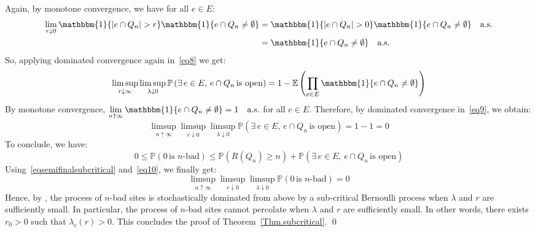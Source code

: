 \documentclass[10pt,a4paper]{amsart}
\theoremstyle{exampstyle}
\theoremstyle{exampnotations}
\begin{document}
Again, by monotone convergence, we have for all $e \in E$:
\begin{align*}
\lim_{r \downarrow 0} \mathbbm{1}\lbrace \vert e \cap Q_n \vert > r \rbrace \mathbbm{1}\lbrace e \cap Q_n \neq \emptyset \rbrace &= \mathbbm{1}\lbrace \vert e \cap Q_n \vert > 0 \rbrace \mathbbm{1}\lbrace e \cap Q_n \neq \emptyset \rbrace \quad \text{a.s.} \\ &= \mathbbm{1}\lbrace e \cap Q_n \neq \emptyset \rbrace \quad \text{a.s.}
\end{align*} 
So, applying dominated convergence again in~\eqref{eq8} we get:
\begin{equation}
\label{eq9}
   \limsup_{r \downarrow \infty}\limsup_{\lambda \downarrow 0} \mathbb{P}\left(\exists \, e \in E, \, e \cap Q_n \, \text{is open} \right)=1-\mathbb{E}\left(\prod_{e \in E } \mathbbm{1}\lbrace e \cap Q_n \neq \emptyset \rbrace \right)
\end{equation}
By monotone convergence, $\displaystyle \lim_{n \uparrow \infty}\mathbbm{1}\lbrace e \cap Q_n \neq \emptyset \rbrace = 1 \quad \text{a.s.}$ for all $e \in E$. Therefore, by dominated convergence in~\eqref{eq9}, we obtain:
\begin{equation}
    \label{eq10}
    \limsup_{n \uparrow \infty}\limsup_{r \downarrow 0}\limsup_{\lambda \downarrow 0} \mathbb{P}\left(\exists \, e \in E, \, e \cap Q_n \, \text{is open} \right) = 1-1 = 0
\end{equation}
To conclude, we have: 
\begin{equation*}
    0 \leq \mathbb{P}(0 \, \text{is $n$-bad}) \leq \mathbb{P}(R(Q_n) \geq n) + \mathbb{P}(\exists \, e \in E, \, e \cap Q_n \, \text{is open})
\end{equation*}
Using~\eqref{eqsemifinalsubcritical} and~\eqref{eq10}, we finally get:
\begin{equation*}
     \limsup_{n \uparrow \infty}\limsup_{r \downarrow 0}\limsup_{\lambda \downarrow 0} \mathbb{P}(0 \, \text{is $n$-bad}) =0
\end{equation*}
Hence, by \cite[Theorem 0.0]{liggett_domination_1997}, the process of $n$-bad sites is stochastically dominated from above by a sub-critical Bernoulli process when $\lambda$ and $r$ are sufficiently small. In particular, the process of $n$-bad sites cannot percolate when $\lambda$ and $r$ are sufficiently small. In other words, there exists $r_0 >0$ such that $\lambda_c(r) > 0$. This concludes the proof of Theorem~\ref{Thm.subcritical}. \qed
\end{document}
